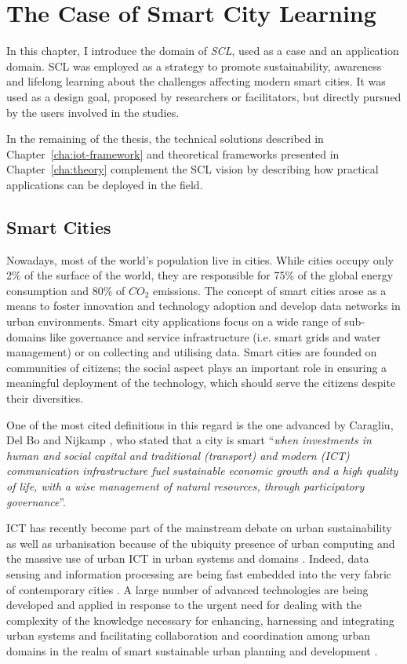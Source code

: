 \chapter{The Case of Smart City Learning}
\label{cha:smart-cities}

In this chapter, I introduce the domain of \textit{SCL}, used as a case and an application domain. SCL was employed as a strategy to promote sustainability, awareness and lifelong learning about the challenges affecting modern smart cities. It was used as a design goal, proposed by researchers or facilitators, but directly pursued by the users involved in the studies.

In the remaining of the thesis, the technical solutions described in Chapter~\ref{cha:iot-framework} and theoretical frameworks presented in Chapter~\ref{cha:theory} complement the SCL vision by describing how practical applications can be deployed in the field.


\section{Smart Cities}

Nowadays, most of the world's population live in cities. While cities occupy only 2\% of the surface of the world, they are responsible for 75\% of the global energy consumption and 80\% of $CO_2$ emissions. The concept of smart cities arose as a means to foster innovation and technology adoption and develop data networks in urban environments. Smart city applications focus on a wide range of sub-domains like governance and service infrastructure (i.e. smart grids and water management) or on collecting and utilising data. Smart cities are founded on communities of citizens; the social aspect plays an important role in ensuring a meaningful deployment of the technology, which should serve the citizens despite their diversities. 

One of the most cited definitions in this regard is the one advanced by Caragliu, Del Bo and Nijkamp \autocite*{caragliu_smart_2011}, who stated that a city is smart \enquote{\textit{when investments in human and social capital and traditional (transport) and modern (ICT) communication infrastructure fuel sustainable economic growth and a high quality of life, with a wise management of natural resources, through participatory governance}}.

ICT has recently become part of the mainstream debate on urban sustainability as well as urbanisation because of the ubiquity presence of urban computing and the massive use of urban ICT in urban systems and domains \autocite{bibri_smart_2017}. Indeed, data sensing and information processing are being fast embedded into the very fabric of contemporary cities \autocites{batty_smart_2012}{bibri_big_2016}. A large number of advanced technologies are being developed and applied in response to the urgent need for dealing with the complexity of the knowledge necessary for enhancing, harnessing and integrating urban systems and facilitating collaboration and coordination among urban domains in the realm of smart sustainable urban planning and development \autocite{bibri_big_2016}.

